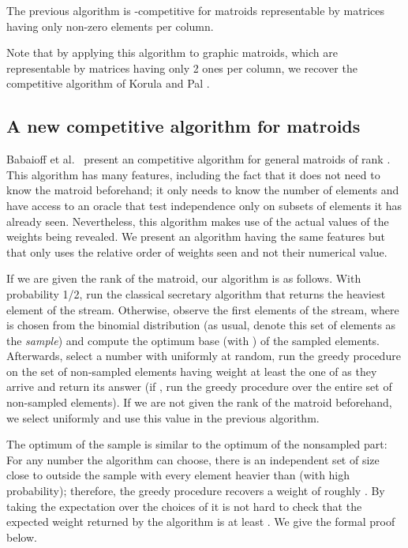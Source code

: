 \documentclass[letterpaper,11pt]{article}
\theoremstyle{definition}
\theoremstyle{remark}
\begin{document}
\begin{thm} The previous algorithm is -competitive for matroids representable by matrices having only  non-zero elements per column.
\end{thm}

Note that by applying this algorithm to graphic matroids, which are representable by matrices having only 2 ones per column, we recover the  competitive algorithm of Korula and Pal \cite{korula2009algorithms}.


\subsection{A new  competitive algorithm for matroids}

Babaioff et al.~\cite{babaioff_matroids_2007} present an  competitive algorithm for general matroids of rank . This algorithm has many features, including the fact that it does not need to know the matroid beforehand; it only needs to know the number of elements and have access to an oracle that test independence only on subsets of elements it has already seen. Nevertheless, this algorithm makes use of the actual values of the weights being revealed. We present an algorithm having the same features but that only uses the relative order of weights seen and not their numerical value.

If we are given the rank of the matroid, our algorithm is as follows. With probability 1/2, run the classical secretary algorithm that returns the heaviest element of the stream. Otherwise, observe the first  elements of the stream, where  is chosen from the binomial distribution  (as usual, denote this set of elements as the \emph{sample}) and compute the optimum base  (with ) of the sampled elements. Afterwards, select a number  with  uniformly at random, run the greedy procedure on the set of non-sampled elements having weight at least the one of  as they arrive and return its answer (if , run the greedy procedure over the entire set of non-sampled elements). If we are not given the rank of the matroid beforehand, we select  uniformly and use this value in the previous algorithm.

The optimum of the sample is similar to the optimum of the nonsampled part: For any number  the algorithm can choose, there is an independent set of size close to  outside the sample with every element heavier than  (with high probability); therefore, the greedy procedure recovers a weight of roughly . By taking the expectation over the choices of  it is not hard to check that the expected weight returned by the algorithm is at least . We give the formal proof below.
\end{document}
